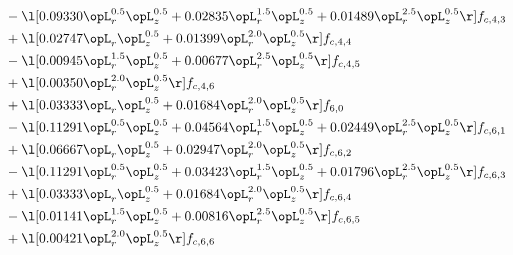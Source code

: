 \begin{alignat}{2}
& - \l[  0.09330 \opL_r^{0.5} \opL_z^{0.5} +  0.02835 \opL_r^{1.5} \opL_z^{0.5} +  0.01489 \opL_r^{2.5} \opL_z^{0.5}  \r] f_{c,4,3} \nonumber \\ 
& + \l[  0.02747 \opL_r \opL_z^{0.5} +  0.01399 \opL_r^{2.0} \opL_z^{0.5}  \r] f_{c,4,4} \nonumber \\ 
& - \l[  0.00945 \opL_r^{1.5} \opL_z^{0.5} +  0.00677 \opL_r^{2.5} \opL_z^{0.5}  \r] f_{c,4,5} \nonumber \\ 
& + \l[  0.00350 \opL_r^{2.0} \opL_z^{0.5}  \r] f_{c,4,6} \nonumber \\ 
& + \l[  0.03333 \opL_r \opL_z^{0.5} +  0.01684 \opL_r^{2.0} \opL_z^{0.5}  \r] f_{6,0} \nonumber \\ 
& - \l[  0.11291 \opL_r^{0.5} \opL_z^{0.5} +  0.04564 \opL_r^{1.5} \opL_z^{0.5} +  0.02449 \opL_r^{2.5} \opL_z^{0.5}  \r] f_{c,6,1} \nonumber \\ 
& + \l[  0.06667 \opL_r \opL_z^{0.5} +  0.02947 \opL_r^{2.0} \opL_z^{0.5}  \r] f_{c,6,2} \nonumber \\ 
& - \l[  0.11291 \opL_r^{0.5} \opL_z^{0.5} +  0.03423 \opL_r^{1.5} \opL_z^{0.5} +  0.01796 \opL_r^{2.5} \opL_z^{0.5}  \r] f_{c,6,3} \nonumber \\ 
& + \l[  0.03333 \opL_r \opL_z^{0.5} +  0.01684 \opL_r^{2.0} \opL_z^{0.5}  \r] f_{c,6,4} \nonumber \\ 
& - \l[  0.01141 \opL_r^{1.5} \opL_z^{0.5} +  0.00816 \opL_r^{2.5} \opL_z^{0.5}  \r] f_{c,6,5} \nonumber \\ 
& + \l[  0.00421 \opL_r^{2.0} \opL_z^{0.5}  \r] f_{c,6,6} \nonumber \\ 
\end{alignat} 


